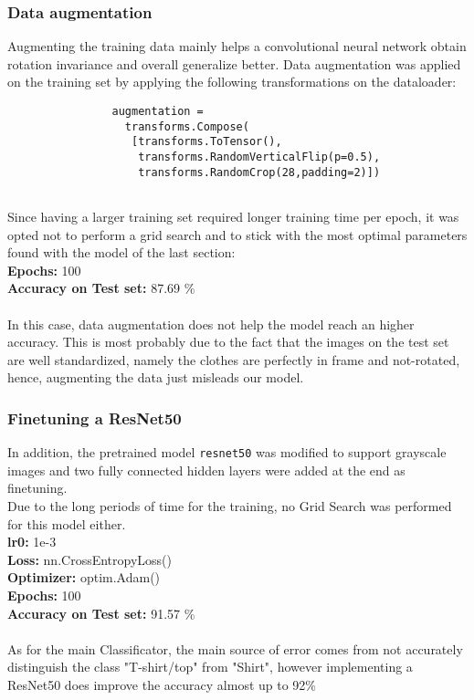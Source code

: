\documentclass[11pt,a4paper,twocolumn]{IEEEtran}
\newcommand{\thinnersepline}{\noindent\makebox[\linewidth]{\rule{7.5cm}{0.01pt}}}
\begin{document}
			\subsubsection{Data augmentation}
			Augmenting the training data mainly helps a convolutional neural network obtain rotation invariance and  overall generalize better.
			Data augmentation was applied on the training set by applying the following transformations on the dataloader:\\
			\begin{verbatim}
				augmentation = 
				  transforms.Compose(
				   [transforms.ToTensor(),
				    transforms.RandomVerticalFlip(p=0.5),
				    transforms.RandomCrop(28,padding=2)])
				
			\end{verbatim}
			Since having a larger training set required longer training time per epoch, it was opted not to perform a grid search and to stick with the most optimal parameters found with the model of the last section:
			\thinnersepline\\
			\textbf{Epochs:} 100\\
			\textbf{Accuracy on Test set:} 87.69 \%\vspace*{-.2cm}\\
			\thinnersepline\\
			In this case, data augmentation does not help the model reach an higher accuracy. This is most probably due to the fact that the images on the test set are well standardized, namely the clothes are perfectly in frame and not-rotated, hence, augmenting the data just misleads our model. \medskip\\
			\subsubsection{Finetuning a ResNet50}
			In addition, the pretrained model \texttt{resnet50} was modified to support grayscale images and two fully connected hidden layers were added at the end as finetuning.\\
			Due to the long periods of time for the training, no Grid Search was performed for this model either.
			\thinnersepline\\
			\textbf{lr0:} 1e-3\\
			\textbf{Loss:} nn.CrossEntropyLoss()\\
			\textbf{Optimizer:} optim.Adam() \\
			\textbf{Epochs:} 100 \\
			\textbf{Accuracy on Test set:} 91.57 \%\vspace*{-.2cm}\\
			\thinnersepline\\
			As for the main Classificator, the main source of error comes from not accurately distinguish the class "T-shirt/top" from "Shirt", however implementing a ResNet50 does improve the accuracy almost up to 92\%
	
\end{document}
